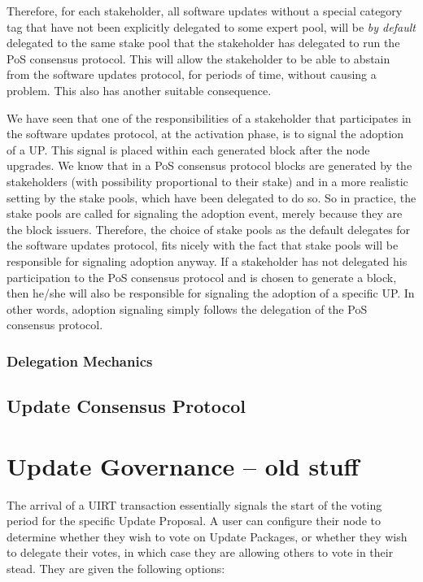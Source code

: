 Therefore, for each stakeholder, all software updates without a special category tag that have not been explicitly delegated to some expert pool, will be \emph{by default} delegated to the same stake pool that the stakeholder has delegated to run the  PoS consensus protocol. This will allow the stakeholder to be able to abstain from the software updates protocol, for periods of time, without causing a problem. This also has another suitable consequence.

We have seen that one of the responsibilities of a stakeholder that participates in the software updates protocol, at the activation phase, is to signal the adoption of a UP. This signal is placed within each generated block after the node upgrades. We know that in a PoS consensus protocol blocks are generated by the stakeholders (with possibility proportional to their stake) and in a more realistic setting by the stake pools, which have been delegated to do so. So in practice, the stake pools are called for signaling the adoption event, merely because they are the block issuers. Therefore, the choice of stake pools as the default delegates for the software updates protocol, fits nicely with the fact that stake pools will be responsible for signaling adoption anyway. If a stakeholder has not delegated his participation to the PoS consensus protocol and is chosen to generate a block, then he/she will also be responsible for signaling the adoption of a specific UP. In other words, adoption signaling simply follows the delegation of the PoS consensus protocol.

\subsubsection{Delegation Mechanics}

\subsection{Update Consensus Protocol}


\section*{Update Governance -- old stuff}
The arrival of a UIRT transaction essentially signals the start of the voting period for the specific Update Proposal. A user can configure their node to determine whether they wish to vote on Update Packages, or whether they wish to delegate their votes, in which case they are allowing others to vote in their stead. They are given the following options:

